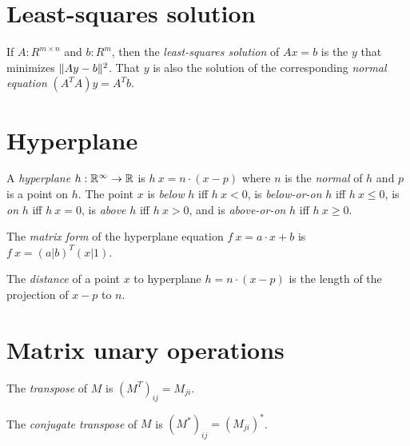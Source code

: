 \section{Least-squares solution}

%
%
%
If \(A : R^{m \times n}\) and \(b : R^m\),
then the \emph{least-squares solution} of \(A x = b\)
is the \(y\) that minimizes \(\lVert A y - b\rVert^2\).
%
That \(y\) is also the solution of the corresponding \emph{normal equation}
\((A^T A) y = A^T b\).

\section{Hyperplane}

%
%
%
%
%
%
A \emph{hyperplane}
\(h : \mathbb{R}^\infty \to \mathbb{R}\)
is \(h~x = n \cdot (x - p)\)
where \(n\) is the \emph{normal} of \(h\)
and \(p\) is a point on \(h\).
The point \(x\)
is \emph{below} \(h\) iff \( h~x < 0 \),
is \emph{below-or-on} \(h\) iff \( h~x \le 0 \),
is \emph{on} \(h\) iff \( h~x = 0 \),
is \emph{above} \(h\) iff \( h~x > 0 \),
and
is \emph{above-or-on} \(h\) iff \( h~x \ge 0 \).

%
%
The \emph{matrix form} of the hyperplane equation \(f~x = a \cdot x + b\)
is \(f~x = (a|b)^T (x|1)\).

The \emph{distance} of a point \(x\) to hyperplane \(h = n \cdot (x - p)\)
is the length of the projection of \(x-p\) to \(n\).

\section{Matrix unary operations}

The
%
%
%
\emph{transpose} of \(M\) is \((M^T)_{ij} = M_{ji}\).

The
%
%
%
%
\emph{conjugate transpose} of \(M\) is \((M^*)_{ij} = (M_{ji})^*\).

